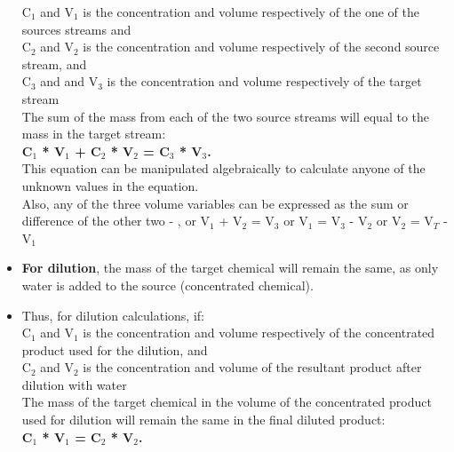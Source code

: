 \documentclass{article}
\begin{document}
\begin{itemize}
C$_1$ and V$_1$ is the concentration and volume respectively of the one of the sources streams and\\
\vspace{0.2cm}
 C$_2$ and V$_2$ is the concentration and volume respectively of the second source stream, and \\
 \vspace{0.2cm}
C$_3$ and and V$_3$ is the concentration and volume respectively of the target stream\\
\vspace{0.3cm}
The sum of the mass from each of the two source streams will equal to the mass in the target stream:\\
\vspace{0.3cm}
\textbf{C$_1$ * V$_1$ + C$_2$ * V$_2$ =  C$_3$ * V$_3$.}\\
\vspace{0.3cm}
This equation can be manipulated algebraically to calculate anyone of the unknown values in the equation.\\
\vspace{0.2cm}
Also, any of the three volume variables can be expressed as the sum or difference of the other two - , or V$_1$ + V$_2$ = V$_3$ or V$_1$ = V$_3$ - V$_2$ or V$_2$ = V$_T$ - V$_1$\\

\item \textbf{For dilution}, the mass of the target chemical will remain the same, as only water is added to the source (concentrated chemical).
\item Thus, for dilution calculations, if:\\
\vspace{0.2cm}
C$_1$ and V$_1$ is the concentration and volume respectively of the concentrated product used for the dilution, and\\
\vspace{0.2cm}
C$_2$ and V$_2$ is the concentration and volume of the resultant product after dilution with water\\
\vspace{0.2cm}
The mass of the target chemical in the volume of the concentrated product used for dilution will remain the same in the final diluted product:\\
\vspace{0.3cm}
\textbf{C$_1$ * V$_1$ =  C$_2$ * V$_2$.}\\

\end{itemize}
\end{document}
